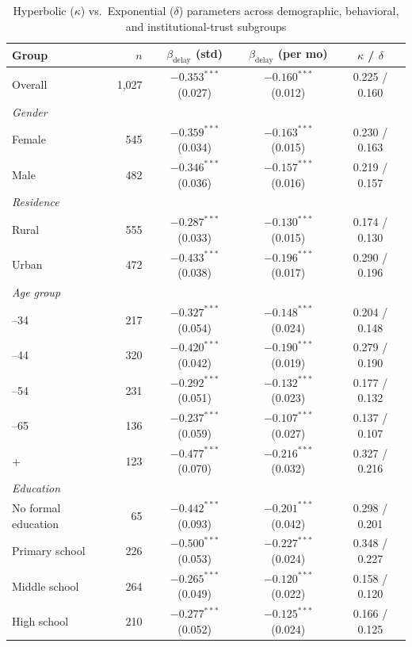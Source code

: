 \documentclass[doublespacing]{utdthesis}
\begin{document}
\begin{table}[!htbp]
\centering
\caption{Hyperbolic ($\kappa$) vs.\ Exponential ($\delta$) parameters across demographic, behavioral, and institutional-trust subgroups}
\label{tab:kappa_delta_subgroups}
\begin{threeparttable}
\setlength{\tabcolsep}{6pt}
\begin{tabular}{l r c c c}
\toprule
Group & $n$ & $\beta_{\text{delay}}$ (std) & $\beta_{\text{delay}}$ (per mo) & $\kappa$ / $\delta$ \\
\midrule
Overall & 1{,}027 & $-0.353^{***}$ (0.027) & $-0.160^{***}$ (0.012) & 0.225 / 0.160 \\
\addlinespace
\textit{Gender} \\
\quad Female & 545 & $-0.359^{***}$ (0.034) & $-0.163^{***}$ (0.015) & 0.230 / 0.163 \\
\quad Male   & 482 & $-0.346^{***}$ (0.036) & $-0.157^{***}$ (0.016) & 0.219 / 0.157 \\
\addlinespace
\textit{Residence} \\
\quad Rural & 555 & $-0.287^{***}$ (0.033) & $-0.130^{***}$ (0.015) & 0.174 / 0.130 \\
\quad Urban & 472 & $-0.433^{***}$ (0.038) & $-0.196^{***}$ (0.017) & 0.290 / 0.196 \\
\addlinespace
\textit{Age group} \\
\quad 18--34 & 217 & $-0.327^{***}$ (0.054) & $-0.148^{***}$ (0.024) & 0.204 / 0.148 \\
\quad 35--44 & 320 & $-0.420^{***}$ (0.042) & $-0.190^{***}$ (0.019) & 0.279 / 0.190 \\
\quad 45--54 & 231 & $-0.292^{***}$ (0.051) & $-0.132^{***}$ (0.023) & 0.177 / 0.132 \\
\quad 55--65 & 136 & $-0.237^{***}$ (0.059) & $-0.107^{***}$ (0.027) & 0.137 / 0.107 \\
\quad 65+    & 123 & $-0.477^{***}$ (0.070) & $-0.216^{***}$ (0.032) & 0.327 / 0.216 \\
\addlinespace
\textit{Education} \\
\quad No formal education & 65  & $-0.442^{***}$ (0.093) & $-0.201^{***}$ (0.042) & 0.298 / 0.201 \\
\quad Primary school      & 226 & $-0.500^{***}$ (0.053) & $-0.227^{***}$ (0.024) & 0.348 / 0.227 \\
\quad Middle school       & 264 & $-0.265^{***}$ (0.049) & $-0.120^{***}$ (0.022) & 0.158 / 0.120 \\
\quad High school         & 210 & $-0.277^{***}$ (0.052) & $-0.125^{***}$ (0.024) & 0.166 / 0.125 \\

\end{tabular}
\end{threeparttable}
\end{table}
\end{document}
